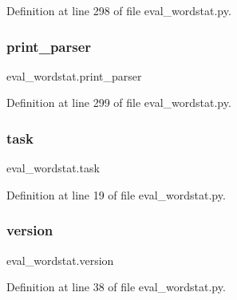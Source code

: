Definition at line 298 of file eval\+\_\+wordstat.\+py.

\mbox{\label{namespaceeval__wordstat_a1eeded546d4fba5edcd7531fe75b95eb}} 
\subsubsection{\texorpdfstring{print\+\_\+parser}{print\_parser}}
{\footnotesize\ttfamily eval\+\_\+wordstat.\+print\+\_\+parser}



Definition at line 299 of file eval\+\_\+wordstat.\+py.

\mbox{\label{namespaceeval__wordstat_a151bdc0806a8f6bc026424f2dbb1555e}} 
\subsubsection{\texorpdfstring{task}{task}}
{\footnotesize\ttfamily eval\+\_\+wordstat.\+task}



Definition at line 19 of file eval\+\_\+wordstat.\+py.

\mbox{\label{namespaceeval__wordstat_af74ced6a7df00b343701ec4ee7279996}} 
\subsubsection{\texorpdfstring{version}{version}}
{\footnotesize\ttfamily eval\+\_\+wordstat.\+version}



Definition at line 38 of file eval\+\_\+wordstat.\+py.

